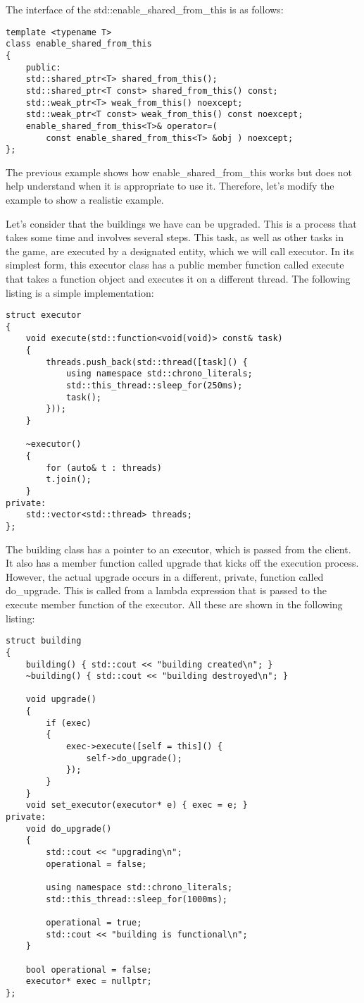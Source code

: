 The interface of the std::enable\_shared\_from\_this is as follows:

\begin{lstlisting}[style=styleCXX]
template <typename T>
class enable_shared_from_this
{
	public:
	std::shared_ptr<T> shared_from_this();
	std::shared_ptr<T const> shared_from_this() const;
	std::weak_ptr<T> weak_from_this() noexcept;
	std::weak_ptr<T const> weak_from_this() const noexcept;
	enable_shared_from_this<T>& operator=(
		const enable_shared_from_this<T> &obj ) noexcept;
};
\end{lstlisting}

The previous example shows how enable\_shared\_from\_this works but does not help understand when it is appropriate to use it. Therefore, let’s modify the example to show a realistic example.

Let’s consider that the buildings we have can be upgraded. This is a process that takes some time and involves several steps. This task, as well as other tasks in the game, are executed by a designated entity, which we will call executor. In its simplest form, this executor class has a public member function called execute that takes a function object and executes it on a different thread. The following listing is a simple implementation:

\begin{lstlisting}[style=styleCXX]
struct executor
{
	void execute(std::function<void(void)> const& task)
	{
		threads.push_back(std::thread([task]() {
			using namespace std::chrono_literals;
			std::this_thread::sleep_for(250ms);
			task();
		}));
	}

	~executor()
	{
		for (auto& t : threads)
		t.join();
	}
private:
	std::vector<std::thread> threads;
};
\end{lstlisting}

The building class has a pointer to an executor, which is passed from the client. It also has a member function called upgrade that kicks off the execution process. However, the actual upgrade occurs in a different, private, function called do\_upgrade. This is called from a lambda expression that is passed to the execute member function of the executor. All these are shown in the following listing:

\begin{lstlisting}[style=styleCXX]
struct building
{
	building() { std::cout << "building created\n"; }
	~building() { std::cout << "building destroyed\n"; }
	
	void upgrade()
	{
		if (exec)
		{
			exec->execute([self = this]() {
				self->do_upgrade();
			});
		}
	}
	void set_executor(executor* e) { exec = e; }
private:
	void do_upgrade()
	{
		std::cout << "upgrading\n";
		operational = false;
		
		using namespace std::chrono_literals;
		std::this_thread::sleep_for(1000ms);
		
		operational = true;
		std::cout << "building is functional\n";
	}

	bool operational = false;
	executor* exec = nullptr;
};
\end{lstlisting}


